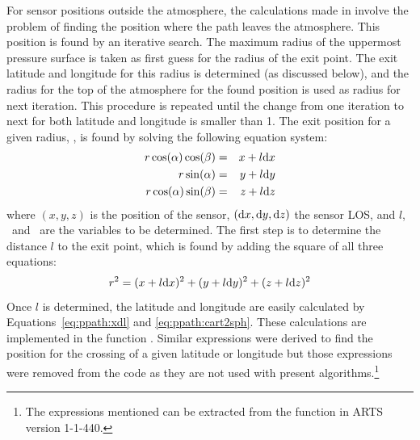 For sensor positions outside the atmosphere, the calculations made in
 involve the problem of finding the
position where the path leaves the atmosphere. This position is found
by an iterative search. The maximum radius of the uppermost pressure
surface is taken as first guess for the radius of the exit point.  The
exit latitude and longitude for this radius is determined (as
discussed below), and the radius for the top of the atmosphere for the
found position is used as radius for next iteration. This procedure is
repeated until the change from one iteration to next for both latitude
and longitude is smaller than 1. The exit position for
a given radius, \Rds, is found by solving the following equation
system:
\begin{eqnarray}
  r \cos(\alpha) \cos(\beta)  & = & x+l\mathrm{d} x \nonumber \\
  r \sin(\alpha)             & = & y+l\mathrm{d} y \\
  r \cos(\alpha) \sin(\beta)  & = & z+l\mathrm{d} z \nonumber
  \label{eq:ppath:rcoss3Da}
\end{eqnarray}
where $(x,y,z)$ is the position of the sensor, $(\mathrm{d} x,\mathrm{d}
y,\mathrm{d} z)$ the sensor LOS, and $l$, \Lat\ and \Lon\ are the variables
to be determined. The first step is to determine the distance $l$ to
the exit point, which is found by adding the square of all three
equations:
\begin{equation}
  r^2 = (x+l\mathrm{d} x)^2 + (y+l\mathrm{d} y)^2 + (z+l\mathrm{d} z)^2
  \label{eq:ppath:rcoss3Db}
\end{equation}
Once $l$ is determined, the latitude and longitude are easily
calculated by Equations~\ref{eq:ppath:xdl} and
\ref{eq:ppath:cart2sph}. These calculations are implemented in the
function .  Similar expressions were
derived to find the position for the crossing of a given latitude or
longitude but those expressions were removed from the code as they are
not used with present algorithms.\footnote{The expressions mentioned
  can be extracted from the function
   in ARTS version 1-1-440.}



\label{sec:ppath:refreuler}

